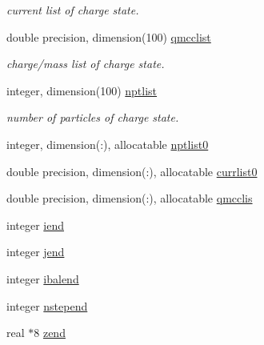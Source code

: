 \begin{DoxyCompactItemize}
\begin{DoxyCompactList}\small\item\em current list of charge state. \end{DoxyCompactList}\item 
double precision, dimension(100) \mbox{\hyperlink{namespaceaccsimulatorclass_a41077f15e4eaaf833944e89b231a9df9}{qmcclist}}
\begin{DoxyCompactList}\small\item\em charge/mass list of charge state. \end{DoxyCompactList}\item 
integer, dimension(100) \mbox{\hyperlink{namespaceaccsimulatorclass_a891a5868a86440d94c4eb40df9f3b8b9}{nptlist}}
\begin{DoxyCompactList}\small\item\em number of particles of charge state. \end{DoxyCompactList}\item 
integer, dimension(\+:), allocatable \mbox{\hyperlink{namespaceaccsimulatorclass_a9fa9911cc9d2b1442c2d6a945394fc7a}{nptlist0}}
\item 
double precision, dimension(\+:), allocatable \mbox{\hyperlink{namespaceaccsimulatorclass_accc2494fdb269aeeba10e0f6eea90690}{currlist0}}
\item 
double precision, dimension(\+:), allocatable \mbox{\hyperlink{namespaceaccsimulatorclass_a6dce29a29cf7312e80b95b700300e37d}{qmcclis}}
\item 
integer \mbox{\hyperlink{namespaceaccsimulatorclass_aa5a33a2f7563789fd061ef4e28d010a5}{iend}}
\item 
integer \mbox{\hyperlink{namespaceaccsimulatorclass_aaf128f52875dead988078d4645537192}{jend}}
\item 
integer \mbox{\hyperlink{namespaceaccsimulatorclass_a9b454cb233fe47004ba9388d9c495805}{ibalend}}
\item 
integer \mbox{\hyperlink{namespaceaccsimulatorclass_a3efdd317f3f447eb0e9af6118c312cb5}{nstepend}}
\item 
real $\ast$8 \mbox{\hyperlink{namespaceaccsimulatorclass_a36e211bc045925eb053915a15d72ea4f}{zend}}
\end{DoxyCompactItemize}
\textbf{ }\par
